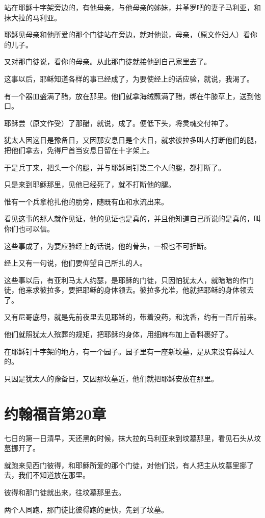 \documentclass[12pt,oneside]{book}
\begin{document}
站在耶稣十字架旁边的，有他母亲，与他母亲的姊妹，并革罗吧的妻子马利亚，和抹大拉的马利亚。

耶稣见母亲和他所爱的那个门徒站在旁边，就对他说，母亲，（原文作妇人）看你的儿子。

又对那门徒说，看你的母亲。从此那门徒就接他到自己家里去了。

这事以后，耶稣知道各样的事已经成了，为要使经上的话应验，就说，我渴了。

有一个器皿盛满了醋，放在那里。他们就拿海绒蘸满了醋，绑在牛膝草上，送到他口。

耶稣尝（原文作受）了那醋，就说，成了。便低下头，将灵魂交付神了。

犹太人因这日是豫备日，又因那安息日是个大日，就求彼拉多叫人打断他们的腿，把他们拿去，免得尸首当安息日留在十字架上。

于是兵丁来，把头一个的腿，并与耶稣同钉第二个人的腿，都打断了。

只是来到耶稣那里，见他已经死了，就不打断他的腿。

惟有一个兵拿枪扎他的肋旁，随既有血和水流出来。

看见这事的那人就作见证，他的见证也是真的，并且他知道自己所说的是真的，叫你们也可以信。

这些事成了，为要应验经上的话说，他的骨头，一根也不可折断。

经上又有一句说，他们要仰望自己所扎的人。

这些事以后，有亚利马太人约瑟，是耶稣的门徒，只因怕犹太人，就暗暗的作门徒，他来求彼拉多，要把耶稣的身体领去。彼拉多允准，他就把耶稣的身体领去了。

又有尼哥底母，就是先前夜里去见耶稣的，带着没药，和沈香，约有一百斤前来。

他们就照犹太人殡葬的规矩，把耶稣的身体，用细麻布加上香料裹好了。

在耶稣钉十字架的地方，有一个园子。园子里有一座新坟墓，是从来没有葬过人的。

只因是犹太人的豫备日，又因那坟墓近，他们就把耶稣安放在那里。

\chapter{约翰福音第20章}
七日的第一日清早，天还黑的时候，抹大拉的马利亚来到坟墓那里，看见石头从坟墓挪开了。

就跑来见西门彼得，和耶稣所爱的那个门徒，对他们说，有人把主从坟墓里挪了去，我们不知道放在那里。

彼得和那门徒就出来，往坟墓那里去。

两个人同跑，那门徒比彼得跑的更快，先到了坟墓。
\end{document}
